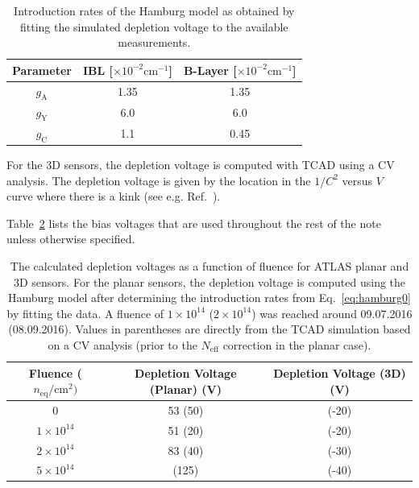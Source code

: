 \begin{table}[!htpb]
\centering
\begin{tabular}{|c|c|c|}
  \hline
   Parameter & IBL [$\times 10^{-2} \text{cm}^{-1}$] & B-Layer [$\times 10^{-2} \text{cm}^{-1}$]	\\
   \hline	
$g_\text{A}$ & 1.35 & 1.35\\
$g_\text{Y}$ & 6.0 & 6.0\\
$g_\text{C}$ & 1.1 & 0.45\\
  \hline  
\end{tabular}
\caption{Introduction rates of the Hamburg model as obtained by fitting the simulated depletion voltage to the available measurements.}
\label{tab:depletionvoltage:introductionrates}
\end{table}

For the 3D sensors, the depletion voltage is computed with TCAD using a CV analysis.  The depletion voltage is given by the location in the $1/C^2$ versus $V$ curve where there is a kink (see e.g. Ref.~\cite{rossi2006pixel}).  

Table~\ref{eq:depletionvoltage} lists the bias voltages that are used throughout the rest of the note unless otherwise specified.

\begin{table}[!htpb]
\centering
\begin{tabular}{|c|c|c|}
  \hline
   Fluence ($n_\text{eq}/\text{cm}^2)$ & Depletion Voltage (Planar) (V)& Depletion Voltage (3D)	 (V)	\\
   \hline	
0 & 53 (50) & (-20)\\
$1\times 10^{14}$ & 51 (20) & (-20)\\
$2\times 10^{14}$& 83 (40) & (-30)\\
$5\times 10^{14}$& (125) & (-40)\\
  \hline  
\end{tabular}
\caption{The calculated depletion voltages as a function of fluence for ATLAS planar and 3D sensors.  For the planar sensors, the depletion voltage is computed using the Hamburg model after determining the introduction rates from Eq.~\ref{eq:hamburg0} by fitting the data.  A fluence of $1\times 10^{14}$ ($2\times 10^{14}$) was reached around 09.07.2016 (08.09.2016).   Values in parentheses are directly from the TCAD simulation based on a CV analysis (prior to the $N_\text{eff}$ correction in the planar case).}
\label{eq:depletionvoltage}
\end{table}

